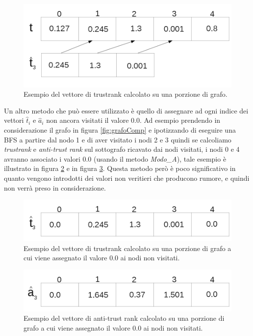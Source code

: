 \begin{figure}
\centering
 \includegraphics{immagini/test/tBFSmodoB}
 \caption{Esempio del vettore di trustrank calcolato su una porzione di grafo.}
 \label{fig:tBFSmodoB}
\end{figure}
Un altro metodo che può essere utilizzato è quello di assegnare ad ogni indice dei vettori \(\hat{t}_i\) e \(\hat{a}_i\) non ancora visitati il valore 0.0. Ad esempio prendendo in considerazione il grafo in figura \ref{fig:grafoComp} e ipotizzando di eseguire una BFS a partire dal nodo 1 e di aver visitato i nodi 2 e 3 quindi se calcoliamo \textit{trustrank} e \textit{anti-trust rank} sul sottografo ricavato dai nodi visitati, i nodi 0 e 4 avranno associato i valori 0.0 (usando il metodo \textit{Modo\_A}), tale esempio è illustrato in figura \ref{fig:tBFSmodoA} e in figura \ref{fig:aBFSmodoA}. Questa metodo però è poco significativo in quanto vengono introdotti dei valori non veritieri che producono rumore, e quindi non verrà preso in considerazione.
\begin{figure}
\centering
 \includegraphics{immagini/test/tBFSmodoA}
 \caption{Esempio del vettore di trustrank calcolato su una porzione di grafo a cui viene assegnato il valore 0.0 ai nodi non visitati.}
 \label{fig:tBFSmodoA}
\end{figure}
\begin{figure}
\centering
 \includegraphics{immagini/test/aBFSmodoA}
 \caption{Esempio del vettore di anti-trust rank calcolato su una porzione di grafo a cui viene assegnato il valore 0.0 ai nodi non visitati.}
 \label{fig:aBFSmodoA}
\end{figure}

